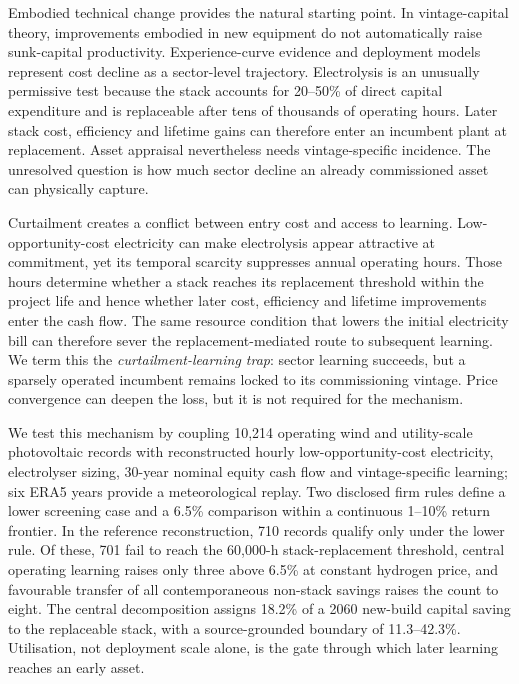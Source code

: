 \documentclass[lineno,pdflatex,sn-nature]{sn-jnl}
\begin{document}
Embodied technical change provides the natural starting point. In vintage-capital theory, improvements embodied in new equipment do not automatically raise sunk-capital productivity\cite{solow1960}. Experience-curve evidence and deployment models represent cost decline as a sector-level trajectory\cite{wright1936,arrow1962,mcdonald2001,nemet2006,ferioli2009,rubin2015,farmer2016,way2022,schmidt2017,brandt2024,song2021,glenk2023,irena2020,doe2024,worldbank2026,odenweller2022,zeyen2023,odenweller2025}. Electrolysis is an unusually permissive test because the stack accounts for 20--50\% of direct capital expenditure and is replaceable after tens of thousands of operating hours. Later stack cost, efficiency and lifetime gains can therefore enter an incumbent plant at replacement. Asset appraisal nevertheless needs vintage-specific incidence. The unresolved question is how much sector decline an already commissioned asset can physically capture.

Curtailment creates a conflict between entry cost and access to learning\cite{glenk2019,fan2025,nea2025hydrogen}. Low-opportunity-cost electricity can make electrolysis appear attractive at commitment, yet its temporal scarcity suppresses annual operating hours. Those hours determine whether a stack reaches its replacement threshold within the project life and hence whether later cost, efficiency and lifetime improvements enter the cash flow. The same resource condition that lowers the initial electricity bill can therefore sever the replacement-mediated route to subsequent learning. We term this the \emph{curtailment-learning trap}: sector learning succeeds, but a sparsely operated incumbent remains locked to its commissioning vintage. Price convergence can deepen the loss, but it is not required for the mechanism.

We test this mechanism by coupling 10,214 operating wind and utility-scale photovoltaic records with reconstructed hourly low-opportunity-cost electricity, electrolyser sizing, 30-year nominal equity cash flow and vintage-specific learning; six ERA5 years provide a meteorological replay. Two disclosed firm rules define a lower screening case and a 6.5\% comparison within a continuous 1--10\% return frontier\cite{changyuan2026,chinabond2026,huadian2025}. In the reference reconstruction, 710 records qualify only under the lower rule. Of these, 701 fail to reach the 60,000-h stack-replacement threshold, central operating learning raises only three above 6.5\% at constant hydrogen price, and favourable transfer of all contemporaneous non-stack savings raises the count to eight. The central decomposition assigns 18.2\% of a 2060 new-build capital saving to the replaceable stack, with a source-grounded boundary of 11.3--42.3\%. Utilisation, not deployment scale alone, is the gate through which later learning reaches an early asset.
\end{document}
